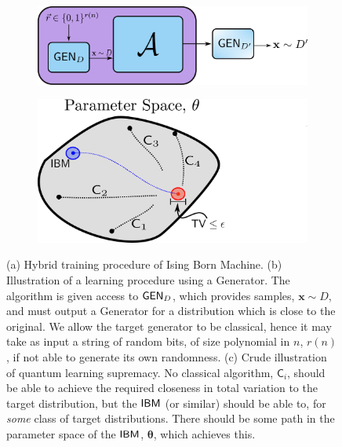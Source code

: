 \begin{figure}[ht]
\centering
%
\begin{subfigure}[t]{0.5\textwidth}
    \centering
    \includegraphics[width=\textwidth, height = 0.3\textwidth]{images/FIG_5a_generator.pdf}
    \caption{}\label{subfig:generator}
\end{subfigure}
%
\qquad
\begin{subfigure}[t]{0.4\textwidth}
\centering
        \includegraphics[width=\textwidth, height = 0.5\textwidth]{images/FIG_5b_tv_hardness_parameter_space.pdf}
    \caption{}
    \label{subfig:qlsillustration}
\end{subfigure}

\caption{
(a) Hybrid training procedure of Ising Born Machine. (b) Illustration of a learning procedure using a Generator. The algorithm is given access to $\operatorname{\textsf{GEN}}_D$, which provides samples, $\mathbf{x}\sim D$, and must output a Generator for a distribution which is close to the original. We allow the target generator to be classical, hence it may take as input a string of random bits, of size polynomial in $n$, $r(n)$, if not able to generate its own randomness. (c) Crude illustration of quantum learning supremacy. No classical algorithm, $\mathsf{C}_i$, should be able to achieve the required closeness in total variation to the target distribution, but the $\textsf{IBM}$ (or similar) should be able to, for \textit{some} class of target distributions. There should be some path in the parameter space of the $\textsf{IBM}$, $\boldsymbol\theta$, which achieves this.
}\label{fig:learning_supremacy}
\end{figure}


